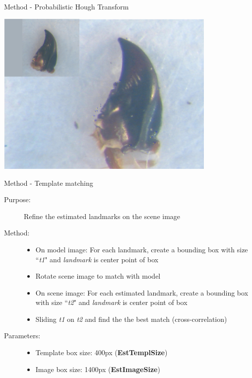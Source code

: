 \documentclass{beamer}
\begin{document}
\begin{frame}{Method - Probabilistic Hough Transform}
	\begin{center}
		\includegraphics[height=8cm]{images/pht19.JPG}	
	\end{center}
\end{frame}
\begin{frame}{Method - Template matching}
	\begin{description}
		\item [Purpose:] Refine the estimated landmarks on the scene image 
		\item [Method:] 
			\begin{itemize}
				\item On model image: For each landmark, create a bounding box with size ``\textit{t1}" and \textit{landmark} is center point of box
				\item Rotate scene image to match with model
				\item On scene image: For each estimated landmark, create a bounding box with size ``\textit{t2}" and \textit{landmark} is center point of box
				\item Sliding \textit{t1} on \textit{t2} and find the the best match (cross-correlation)
			\end{itemize}
		\item [Parameters:]
			\begin{itemize}
				\item Template box size: 400px (\textbf{EstTemplSize})
				\item Image box size: 1400px (\textbf{EstImageSize})
			\end{itemize}
	\end{description}
\end{frame}
\end{document}
